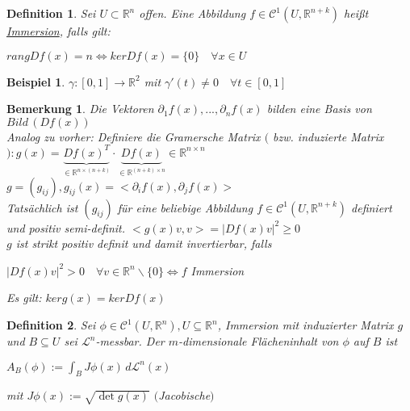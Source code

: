 \documentclass[11pt]{memoir}
\theoremstyle{changebreak}
\newtheorem{Definition}{Definition}[chapter]
\newtheorem{Bemerkung}{Bemerkung}[chapter]
\newtheorem{Beispiel}{Beispiel}[chapter]
\begin{document}
\begin{Definition}
Sei $U \subset \mathbb R^n$ offen. Eine Abbildung $f \in \mathscr C^1(U, \mathbb R^{n+k})$ heißt \underline{Immersion}, falls gilt:
\begin{center}
	$ rang D f(x) = n \Leftrightarrow ker D f(x) = \{0\}\quad \forall x \in U$
\end{center}
\end{Definition}

\begin{Beispiel}
$\gamma: [0, 1] \rightarrow \mathbb R^2$ mit $\gamma'(t) \ne 0\quad \forall t \in [0,1]$
\end{Beispiel}

\begin{Bemerkung}
Die Vektoren $\partial_1 f(x), ..., \partial_n f(x)$ bilden eine Basis von $Bild\,(Df(x))$ \\
Analog zu vorher: Definiere die Gramersche Matrix $($ bzw. induzierte Matrix$): g(x) = \underbrace{Df(x)^T}_{\in \mathbb R^{n \times (n+k)}}\cdotp \underbrace{Df(x)}_{\in \mathbb R^{(n+k) \times n}} \in \mathbb R^{n\times n}$ \\
$g= (g_{ij}), g_{ij}(x) = <\partial_i f(x), \partial_j f(x)>$ \\
Tatsächlich ist $(g_{ij})$ für eine beliebige Abbildung $f \in \mathscr C^1(U, \mathbb R^{n+k})$ definiert und positiv semi-definit. $<g(x)v, v> = |Df(x)v|^2 \geq 0$ \\
$g$ ist strikt positiv definit und damit invertierbar, falls
\begin{center}
	$|Df(x)v|^2 > 0\quad \forall v \in \mathbb R^n \backslash \{0\} \Leftrightarrow f$ Immersion
\end{center}
Es gilt: $ker g(x) = ker Df(x)$
\end{Bemerkung}

\begin{Definition}
Sei $\phi \in \mathscr C^1(U, \mathbb R^n), U \subseteq \mathbb R^n$, Immersion mit induzierter Matrix $g$ und $B \subseteq U$ sei $\mathscr L^n$-messbar. Der $m$-dimensionale Flächeninhalt von $\phi$ auf $B$ ist
\begin{center}
	$A_B(\phi) := \int_B J \phi(x) \, d \mathscr L^n(x)$
\end{center}
mit $J\phi(x) := \sqrt{\det g(x)}$ $($Jacobische$)$
\end{Definition}

\end{document}
